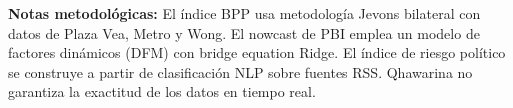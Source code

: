 \documentclass[10pt,a4paper]{article}
\begin{document}
\vfill
\begin{tcolorbox}[
  enhanced,
  colback=bg,
  colframe=border,
  boxrule=0.5pt,
  arc=2pt,
  left=6pt, right=6pt, top=4pt, bottom=4pt,
]
  {\footnotesize\color{ink3}
    \textbf{Notas metodológicas:} El índice BPP usa metodología Jevons bilateral con datos de Plaza Vea, Metro y Wong.
    El nowcast de PBI emplea un modelo de factores dinámicos (DFM) con bridge equation Ridge.
    El índice de riesgo político se construye a partir de clasificación NLP sobre fuentes RSS.
    Qhawarina no garantiza la exactitud de los datos en tiempo real.
  }
\end{tcolorbox}
\end{document}
